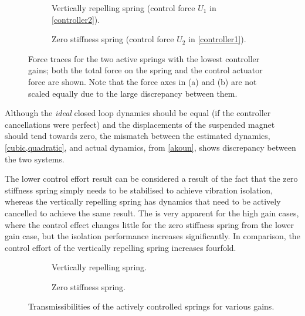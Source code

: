 \begin{figure}
\begin{wide}
  \begin{subfigure}
    \caption{Vertically repelling spring (control 
     force $U_1$ in \eqref{controller2}).}  
  \end{subfigure}
  \hfill
  \begin{subfigure}
    \caption{Zero stiffness spring (control force 
     $U_2$ in \eqref{controller1}).}    
  \end{subfigure}
  \end{wide}
  \caption{Force traces for the two active springs with the lowest
    controller gains; both the total force on the spring and the
    control actuator force are shown.  Note that the force axes in (a)
    and (b) are not scaled equally due to the large discrepancy
    between them.}
\end{figure}

Although the \emph{ideal} closed loop dynamics should be equal (if
the controller cancellations were perfect) and the displacements of
the suspended magnet should tend towards zero, the mismatch between
the estimated dynamics, \eqref{cubic,quadratic}, and actual
dynamics, from \eqref{akoun}, shows discrepancy between the two
systems.

The lower control effort result can be considered a result of the
fact that the zero stiffness spring simply needs to be stabilised to
achieve vibration isolation, whereas the vertically repelling spring
has dynamics that need to be actively cancelled to achieve the same
result. The is very apparent for the high gain cases, where the
control effect changes little for the zero stiffness spring from the
lower gain case, but the isolation performance increases
significantly. In comparison, the control effort of the vertically
repelling spring increases fourfold.

\begin{figure}
  \begin{wide}
    \begin{subfigure}
      \caption{Vertically repelling spring.}
    \end{subfigure}
    \hfill
    \begin{subfigure}
      \caption{Zero stiffness spring.}
    \end{subfigure}
  \end{wide}
  \caption{Transmissibilities of the actively controlled springs for various gains.}
\end{figure}


